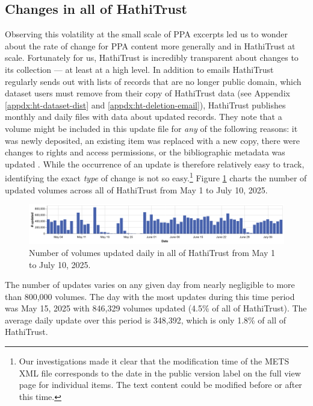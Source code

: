 \documentclass[final]{anthology-ch} %
\begin{document}
\subsection{Changes in all of HathiTrust}

Observing this volatility at the small scale of PPA excerpts led us to wonder about the rate of change for PPA content more generally and in HathiTrust at scale. Fortunately for us, HathiTrust is incredibly transparent about changes to its collection — at least at a high level. In addition to emails HathiTrust regularly sends out with lists of records that are no longer public domain, which dataset users must remove from their copy of HathiTrust data (see Appendix \ref{appdx:ht-dataset-dist} and \ref{appdx:ht-deletion-email}), HathiTrust publishes monthly and daily files with data about updated records. They note that a volume might be included in this update file for \textit{any} of the following reasons: it was newly deposited, an existing item was replaced with a new copy, there were changes to rights and access permissions, or the bibliographic metadata was updated \cite{noauthor_hathifiles_nodate}. While the occurrence of an update is therefore relatively easy to track, identifying the exact \textit{type} of change is not so easy.\footnote{Our investigations made it clear that the modification time of the METS XML file corresponds to the date in the public version label on the full view page for individual items. The text content could be modified before or after this time. } Figure \ref{fig:hathi-daily-updates} charts the number of updated volumes across all of HathiTrust from May 1 to July 10, 2025.
\begin{figure}[t!]
    \centering
    \includegraphics[width=1\linewidth]{images/hathitrust_changes_countonly.png}
    \caption{Number of volumes updated daily in all of HathiTrust from May 1 to July 10, 2025.}
    \label{fig:hathi-daily-updates}
\end{figure}
The number of updates varies on any given day from nearly negligible to more than 800,000 volumes. The day with the most updates during this time period was May 15, 2025 with 846,329 volumes updated (4.5\% of all of HathiTrust). The average daily update over this period is 348,392, which is only 1.8\% of all of HathiTrust.
\end{document}
